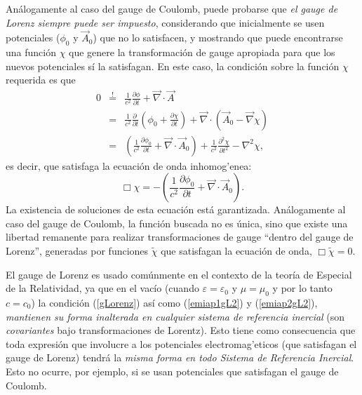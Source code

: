 Análogamente al caso del gauge de Coulomb, puede probarse que \textit{el gauge de Lorenz siempre puede ser impuesto}, considerando que inicialmente se usen potenciales ($\phi_0$ y $\vec{A}_0$) que no lo satisfacen, y mostrando que puede encontrarse una función $\chi$ que genere la transformación de gauge apropiada para que los nuevos potenciales sí la satisfagan. En este caso, la condición sobre la función $\chi$ requerida es que
\begin{eqnarray}
0&\stackrel{!}{=}&\frac{1}{c^2}\frac{\partial\phi}{\partial t}+\vec{\nabla}\cdot\vec{A} \\
&=&\frac{1}{c^2}\frac{\partial\ }{\partial t}\left(\phi_0+\frac{\partial\chi}{\partial t}\right)+\vec{\nabla}\cdot\left(\vec{A}_0-\vec\nabla\chi\right) \\
&=&\left(\frac{1}{c^2}\frac{\partial\phi_0}{\partial t} +\vec{\nabla}\cdot\vec{A}_0\right) +\frac{1}{c^2}\frac{\partial^2\chi }{\partial t^2}-\nabla^2\chi,
\end{eqnarray}
es decir, que satisfaga la ecuación de onda inhomog'enea:
\begin{equation}
\Box\chi=-\left(\frac{1}{c^2}\frac{\partial\phi_0}{\partial t} +\vec{\nabla}\cdot\vec{A}_0\right).
\end{equation}
La existencia de soluciones de esta ecuación está garantizada. Análogamente al caso del gauge de Coulomb, la función buscada no es única, sino que existe una libertad remanente para realizar transformaciones de gauge ``dentro del gauge de Lorenz'', generadas por funciones $\tilde\chi$ que satisfagan la ecuación de onda, $\Box\tilde\chi=0$. 

El gauge de Lorenz es usado comúnmente en el contexto de la teoría de Especial de la Relatividad, ya que en el vacío (cuando $\varepsilon=\varepsilon_0$ y $\mu=\mu_0$ y por lo tanto $c=c_0$) la condición (\ref{gLorenz}) así como (\ref{emiap1gL2}) y (\ref{emiap2gL2}), \textit{mantienen su forma inalterada en cualquier sistema de referencia inercial} (son \textit{covariantes} bajo transformaciones de Lorentz). Esto tiene como consecuencia que toda expresión que involucre a los potenciales electromag'eticos (que satisfagan el gauge de Lorenz) tendrá la \textit{misma forma en todo Sistema de Referencia Inercial}. Esto no ocurre, por ejemplo, si se usan potenciales que satisfagan el gauge de Coulomb.